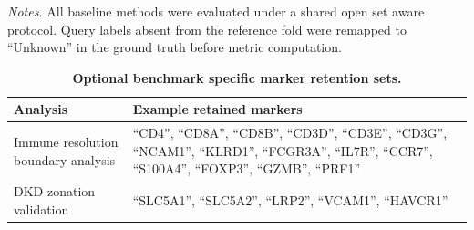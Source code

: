 \documentclass[11pt]{article}
\begin{document}
\begin{table}[htbp]
\vspace{0.5em}
{\raggedright\scriptsize\textit{Notes.} All baseline methods were evaluated under a shared open set aware protocol. Query labels absent from the reference fold were remapped to ``Unknown'' in the ground truth before metric computation.\par}
\end{table}

\FloatBarrier

\begin{table}[htbp]
\centering
\caption{\textbf{Optional benchmark specific marker retention sets.}}
\label{tab:s8_marker_sets}
\scriptsize
\begin{tabularx}{\textwidth}{@{}L{0.22\textwidth} Y@{}}
\toprule
\textbf{Analysis} & \textbf{Example retained markers} \\
\midrule
Immune resolution boundary analysis & ``CD4'', ``CD8A'', ``CD8B'', ``CD3D'', ``CD3E'', ``CD3G'', ``NCAM1'', ``KLRD1'', ``FCGR3A'', ``IL7R'', ``CCR7'', ``S100A4'', ``FOXP3'', ``GZMB'', ``PRF1'' \\
DKD zonation validation & ``SLC5A1'', ``SLC5A2'', ``LRP2'', ``VCAM1'', ``HAVCR1'' \\
\bottomrule
\end{tabularx}
\end{table}

\FloatBarrier
\end{document}
